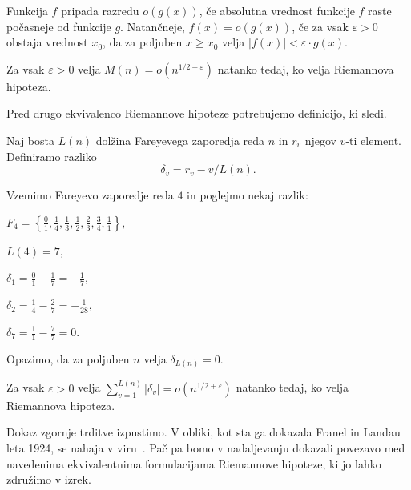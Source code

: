 \documentclass[mat1]{fmfdelo}
\begin{document}
\begin{definicija}
Funkcija $f$ pripada razredu $o \left(g(x) \right)$, če absolutna vrednost funkcije $f$ raste počasneje od funkcije $g$.
Natančneje, $f(x) = o \left(g(x) \right)$, če za vsak $\varepsilon>0$ obstaja vrednost $x_{0}$, da za poljuben $x \geq x_{0}$ velja $|f(x)| < \varepsilon \cdot g(x)$.
\end{definicija}

\begin{trditev}
Za vsak $\varepsilon>0$ velja \( M(n) = o(n^{1/2+\varepsilon}) \) natanko tedaj, ko velja Riemannova hipoteza.
\end{trditev}

Pred drugo ekvivalenco Riemannove hipoteze potrebujemo definicijo, ki sledi.

\begin{definicija}
Naj bosta $L(n)$ dolžina Fareyevega zaporedja reda $n$ in $r_{v}$ njegov $v$-ti element. Definiramo razliko
\begin{equation}
\delta_{v}= r_{v}-v/L(n).
\end{equation}
\end{definicija}

\begin{primer}
Vzemimo Fareyevo zaporedje reda $4$ in poglejmo nekaj razlik:

\(F_4 = \left \{\frac{0}{1}, \frac{1}{4}, \frac{1}{3}, \frac{1}{2}, \frac{2}{3}, \frac{3}{4}, \frac{1}{1} \right \}, \)

\( L(4) = 7, \)

\( \delta_{1}= \frac{0}{1} - \frac{1}{7} = -\frac{1}{7}, \)

\( \delta_{2}= \frac{1}{4} - \frac{2}{7} = -\frac{1}{28}, \)

\( \delta_{7}= \frac{1}{1} - \frac{7}{7} = 0. \)

Opazimo, da za poljuben $n$ velja $\delta_{L(n)}=0$.
\end{primer}

\begin{trditev}
Za vsak $\varepsilon>0$ velja \( \sum_{v=1}^{L(n)}|\delta_{v}| = o(n^{1/2+\varepsilon}) \) natanko tedaj, ko velja Riemannova hipoteza.
\end{trditev}

Dokaz zgornje trditve izpustimo. V obliki, kot sta ga dokazala Franel in Landau leta 1924, se nahaja v viru~\cite{franel-landau}. Pač pa bomo v nadaljevanju dokazali povezavo med navedenima ekvivalentnima formulacijama Riemannove hipoteze, ki jo lahko združimo v izrek.
\end{document}
